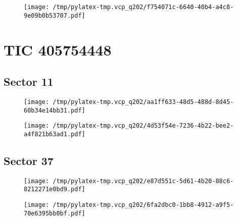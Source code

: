 \documentclass{report}%
\begin{document}
%


\begin{figure}[H]%
\begin{center}%
\centering%
\texttt{[image: /tmp/pylatex-tmp.vcp\_q202/f754071c-6640-40b4-a4c8-9e09b0b53707.pdf]}%
\end{center}%
\end{figure}

%
\section{TIC 405754448}%
\label{sec:TIC405754448}%
\subsection{Sector 11}%
\label{subsec:40575444811}%


\begin{figure}[H]%
\begin{center}%
\centering%
\texttt{[image: /tmp/pylatex-tmp.vcp\_q202/aa1ff633-48d5-488d-8d45-60b34e14bb31.pdf]}%
\end{center}%
\end{figure}

%


\begin{figure}[H]%
\begin{center}%
\centering%
\texttt{[image: /tmp/pylatex-tmp.vcp\_q202/4d53f54e-7236-4b22-bee2-a4f821b63ad1.pdf]}%
\end{center}%
\end{figure}

%
\subsection{Sector 37}%
\label{subsec:40575444837}%


\begin{figure}[H]%
\begin{center}%
\centering%
\texttt{[image: /tmp/pylatex-tmp.vcp\_q202/e87d551c-5d61-4b20-88c6-8212271e0bd9.pdf]}%
\end{center}%
\end{figure}

%


\begin{figure}[H]%
\begin{center}%
\centering%
\texttt{[image: /tmp/pylatex-tmp.vcp\_q202/6fa2dbc0-1bb8-4912-a9f5-70e6395bb0bf.pdf]}%
\end{center}%
\end{figure}
\end{document}
